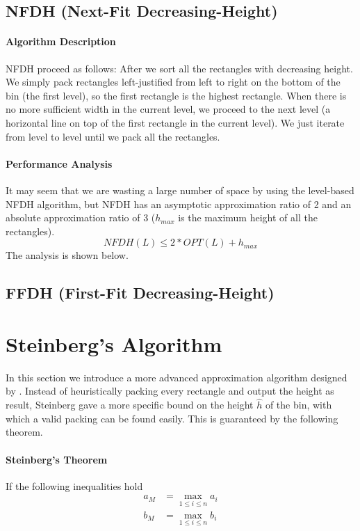 \documentclass[sigplan,screen,nonacm]{acmart}\settopmatter{printfolios=true,printccs=false,printacmref=false}
\begin{document}
\subsection{NFDH (Next-Fit Decreasing-Height)}
\paragraph*{Algorithm Description}
NFDH proceed as follows: After we sort all the rectangles with decreasing height. We simply pack rectangles left-justified from left to right on the bottom of the bin (the first level), so the first rectangle is the highest rectangle. When there is no more sufficient width in the current level, we proceed to the next level (a horizontal line on top of the first rectangle in the current level). We just iterate from level to level until we pack all the rectangles.
\paragraph{Performance Analysis}
It may seem that we are wasting a large number of space by using the level-based NFDH algorithm, but NFDH has an asymptotic approximation ratio of 2 and an absolute approximation ratio of 3 ($h_{max}$ is the maximum height of all the rectangles).
$$NFDH(L) \leq 2*OPT(L) + h_{max}$$
The analysis is shown below.\par

\subsection{FFDH (First-Fit Decreasing-Height)}

\section{Steinberg's Algorithm}
\par In this section we introduce a more advanced approximation algorithm designed by \cite{steinberg1997strip}. Instead of heuristically packing every rectangle and output the height as result, Steinberg gave a more specific bound on the height $\hat{h}$ of the bin, with which a valid packing can be found easily. This is guaranteed by the following theorem.
\paragraph{Steinberg's Theorem} If the following inequalities hold
\begin{eqnarray}
	a_M &= \max_{1\leq i\leq n} a_i \\
	b_M &= \max_{1\leq i\leq n} b_i \\
\end{eqnarray}


\end{document}
